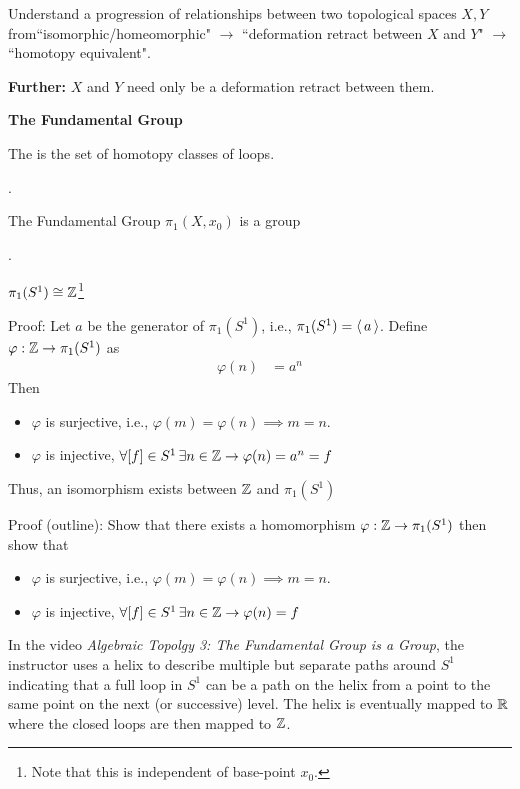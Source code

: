 \documentclass[12pt,a4paper]{report}
\newcommand{\FUNDG}[1]{\pi_1(#1)}
\begin{document}
\begin{description}
\begin{theorem}
	\end{theorem}
	
	\begin{remark} Understand a progression of relationships between two topological spaces $X,Y$ from``isomorphic/homeomorphic" $\to$ ``deformation retract between $X$ and $Y$" $\to$ ``homotopy equivalent".
	\end{remark}
	
	 \textbf{Further: } $X$ and $Y$ need only be a deformation retract between them.
	
	\item \textbf{The Fundamental Group}

	The  is the set of homotopy classes of loops.
		
	\begin{theorem}.
	
	The Fundamental Group $\pi_1(X, x_0)$ is a group
	
	\end{theorem}
	
	\begin{theorem}.
	
	$\pi_1(S^1) \cong \mathbb{Z}$\footnote{Note that this is independent of base-point $x_0$.}
	
	Proof: Let $a$ be the generator of $\FUNDG{S^1}$, i.e., $\FUNDG{S^1}= \ABRACKET{a}$.  Define $\varphi:\Z \to \FUNDG{S^1}$ as 
	\begin{align*}
		\varphi(n) &= a^n
	\end{align*}Then
	\begin{itemize}
		\item $\varphi$ is surjective, i.e., $\varphi(m) = \varphi(n) \implies m=n$.
		\item $\varphi$ is injective, $\forall [f] \in S^1\, \exists n\in \mathbb{Z} \to \varphi(n) = a^n = f$
	\end{itemize}Thus, an isomorphism exists between $\mathbb{Z}$ and $\FUNDG{S^1}$

	Proof (outline):  Show that there exists a homomorphism $\varphi: \mathbb{Z} \to \pi_1(S^1)$ then show that 
	\begin{itemize}
		\item $\varphi$ is surjective, i.e., $\varphi(m) = \varphi(n) \implies m=n$.
		\item $\varphi$ is injective, $\forall [f] \in S^1\, \exists n\in \mathbb{Z} \to \varphi(n) = f$
	\end{itemize}
	
	\begin{remark}In the video \textit{Algebraic Topolgy 3: The Fundamental Group is a Group}, the instructor uses a helix to describe multiple but separate paths around $S^1$ indicating that a full loop in $S^1$ can be a path on the helix from a point to the same point on the next (or successive) level.  The helix is eventually mapped to $\mathbb{R}$ where the closed loops are then mapped to $\mathbb{Z}$.
	\end{remark}
	

\end{theorem}
\end{description}
\end{document}
